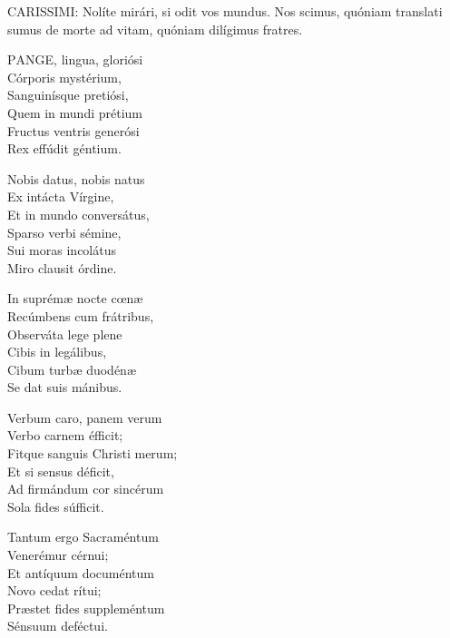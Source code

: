 



\lettrine[lines=2]{C}{ARISSIMI}: Nolíte mirári, si odit vos mundus. Nos scimus, quóniam translati sumus de morte ad vitam, quóniam dilígimus fratres.


\lettrine[lines=2]{P}{ANGE}, lingua, gloriósi\\
Córporis mystérium,\\
Sanguinísque pretiósi,\\
Quem in mundi prétium\\
Fructus ventris generósi\\
Rex effúdit géntium.

Nobis datus, nobis natus\\
Ex intácta Vírgine,\\
Et in mundo conversátus,\\
Sparso verbi sémine,\\
Sui moras incolátus\\
Miro clausit órdine.

In suprémæ nocte cœnæ\\
Recúmbens cum frátribus,\\
Observáta lege plene\\
Cibis in legálibus,\\
Cibum turbæ duodénæ\\
Se dat suis mánibus.

Verbum caro, panem verum\\
Verbo carnem éfficit;\\
Fitque sanguis Christi merum;\\
Et si sensus déficit,\\
Ad firmándum cor sincérum\\
Sola fides súfficit.


Tantum ergo Sacraméntum\\
Venerémur cérnui;\\
Et antíquum documéntum\\
Novo cedat rítui;\\
Præstet fides suppleméntum\\
Sénsuum deféctui.

